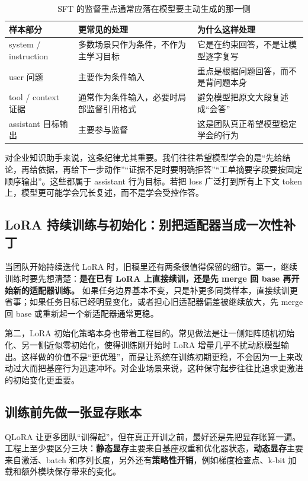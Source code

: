 \begin{table}[H]
\centering
\small
\begin{tabularx}{\textwidth}{>{\raggedright\arraybackslash}p{3cm}>{\raggedright\arraybackslash}p{3.2cm}>{\raggedright\arraybackslash}X}
\toprule
\textbf{样本部分} & \textbf{更常见的处理} & \textbf{为什么这样处理} \\
\midrule
system / instruction & 多数场景只作为条件，不作为主学习目标 & 它是在约束回答，不是让模型逐字复写 \\
user 问题 & 主要作为条件输入 & 重点是根据问题回答，而不是背问题本身 \\
tool / context 证据 & 通常作为条件输入，必要时局部监督引用格式 & 避免模型把原文大段复述成“会答” \\
assistant 目标输出 & 主要参与监督 & 这是团队真正希望模型稳定学会的行为 \\
\bottomrule
\end{tabularx}
\caption{SFT 的监督重点通常应落在模型要主动生成的那一侧}
\label{tab:sft-loss-mask}
\end{table}

对企业知识助手来说，这条纪律尤其重要。我们往往希望模型学会的是“先给结论，再给依据，再给下一步动作”“证据不足时要明确拒答”“工单摘要字段要按固定顺序输出”。这些都属于 assistant 行为目标。若把 loss 广泛打到所有上下文 token 上，模型更可能学会冗长复述，而不是学会受控作答。

\subsection{LoRA 持续训练与初始化：别把适配器当成一次性补丁}
当团队开始持续迭代 LoRA 时，旧稿里还有两条很值得保留的细节。第一，继续训练时要先想清楚：\textbf{是在已有 LoRA 上直接续训，还是先 merge 回 base 再开始新的适配器训练。} 如果任务边界基本不变，只是补更多同类样本，直接续训更省事；如果任务目标已经明显变化，或者担心旧适配器偏差被继续放大，先 merge 回 base 或重新起一个新适配器通常更稳。

第二，LoRA 初始化策略本身也带着工程目的。常见做法是让一侧矩阵随机初始化、另一侧近似零初始化，使得训练刚开始时 LoRA 增量几乎不扰动原模型输出。这样做的价值不是“更优雅”，而是让系统在训练初期更稳，不会因为一上来改动过大而把基座行为迅速冲坏。对企业场景来说，这种保守起步往往比追求更激进的初始变化更重要。

\subsection{训练前先做一张显存账本}
QLoRA 让更多团队“训得起”，但在真正开训之前，最好还是先把显存账算一遍。工程上至少要区分三块：\textbf{静态显存}主要来自基座权重和优化器状态，\textbf{动态显存}主要来自激活、batch 和序列长度，另外还有\textbf{策略性开销}，例如梯度检查点、k-bit 加载和额外模块保存带来的变化。

